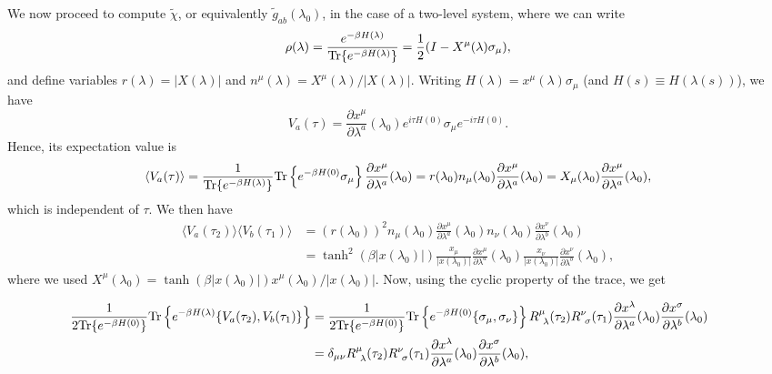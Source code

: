 We now proceed to compute $\tilde{\chi}$, or equivalently $\tilde{g}_{ab}(\lambda_0)$, in the case of a two-level system, where we can write
\begin{equation*}
\rho(\lambda)=\frac{e^{-\beta H(\lambda)}}{\text{Tr}\{e^{-\beta H(\lambda)}\}}=\frac{1}{2}(I-X^{\mu}(\lambda)\sigma_{\mu}),
\end{equation*}
and define variables $r(\lambda)=|X(\lambda)|$ and $n^{\mu}(\lambda)=X^{\mu}(\lambda)/|X(\lambda)|$.
Writing $H(\lambda)=x^{\mu}(\lambda)\sigma_{\mu}$ (and $H(s)\equiv H(\lambda(s))$), we have
\begin{equation*}
V_{a}(\tau)=\frac{\partial x^{\mu}}{\partial \lambda^{a}}(\lambda_0)e^{i\tau H(0)}\sigma_{\mu} e^ {-i\tau H(0)}.
\end{equation*}
Hence, its expectation value is
\begin{equation*}
\langle V_{a}(\tau)\rangle =\frac{1}{\text{Tr}\{e^{-\beta H(\lambda)}\}} \text{Tr}\left\{e^{-\beta H(0)}\sigma_{\mu}\right\}\frac{\partial x^{\mu}}{\partial \lambda^{a}}(\lambda_0)
=r(\lambda_0)n_{\mu}(\lambda_0)\frac{\partial x^{\mu}}{\partial \lambda^{a}}(\lambda_0)=X_{\mu}(\lambda_0)\frac{\partial x^{\mu}}{\partial \lambda^a}(\lambda_0),
\end{equation*}
which is independent of $\tau$. We then have
\begin{eqnarray*}
\langle V_{a}(\tau_2)\rangle \langle V_{b}(\tau_1)\rangle &=(r(\lambda_0))^2n_{\mu}(\lambda_0)\frac{\partial x^{\mu}}{\partial \lambda^{a}}(\lambda_0)n_{\nu}(\lambda_0)\frac{\partial x^{\nu}}{\partial \lambda^{b}}(\lambda_0)\\
&=\tanh^2(\beta|x(\lambda_0)|)\frac{x_{\mu}}{|x(\lambda_0)|}\frac{\partial x^{\mu}}{\partial \lambda^{a}}(\lambda_0)\frac{x_{\nu}}{|x(\lambda_0)|}\frac{\partial x^{\nu}}{\partial \lambda^{b}}(\lambda_0),
\end{eqnarray*}
where we used $X^{\mu}(\lambda_0)=\tanh(\beta |x(\lambda_0)|)x^{\mu}(\lambda_0)/|x(\lambda_0)|$.
Now, using the cyclic property of the trace, we get
\begin{small}
\begin{eqnarray}
\!\!\!\!\!\!\!\!\frac{1}{2\tr\{e^{-\beta H(0)}\}}\tr \left\{ e^{-\beta H(\lambda)}\{V_{a}(\tau_2),V_{b}(\tau_1)\} \right\}&=
\frac{1}{2\tr\{e^{-\beta H(0)}\}}\tr \left\{ e^{-\beta H(0)}\{\sigma_{\mu},\sigma_{\nu}\}\right\}R^{\mu}_{\ \lambda}(\tau_2)R^{\nu}_{\ \sigma}(\tau_1)\frac{\partial x^{\lambda}}{\partial \lambda^{a}}(\lambda_0)\frac{\partial x^{\sigma}}{\partial \lambda^{b}}(\lambda_0)\nonumber\\
&=\delta_{\mu\nu}R^{\mu}_{\ \lambda}(\tau_2)R^{\nu}_{\ \sigma}(\tau_1)\frac{\partial x^{\lambda}}{\partial \lambda^{a}}(\lambda_0)\frac{\partial x^{\sigma}}{\partial \lambda^{b}}(\lambda_0),
\label{eq:anti-com}
\end{eqnarray}
\end{small}
